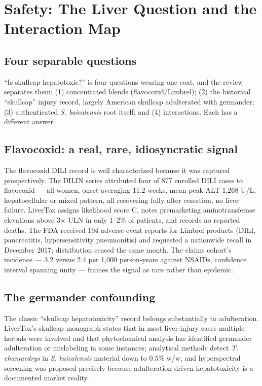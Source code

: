 \section{Safety: The Liver Question and the Interaction Map}
\label{sec:safety}

\subsection{Four separable questions}

``Is skullcap hepatotoxic?'' is four questions wearing one coat, and the review separates them: (1) concentrated blends (flavocoxid/Limbrel); (2) the historical ``skullcap'' injury record, largely American skullcap adulterated with germander; (3) authenticated \textit{S. baicalensis} root itself; and (4) interactions. Each has a different answer.

\subsection{Flavocoxid: a real, rare, idiosyncratic signal}

The flavocoxid DILI record is well characterized because it was captured prospectively. The DILIN series attributed four of 877 enrolled DILI cases to flavocoxid --- all women, onset averaging 11.2 weeks, mean peak ALT 1{,}268 U/L, hepatocellular or mixed pattern, all recovering fully after cessation, no liver failure. LiverTox assigns likelihood score C, notes premarketing aminotransferase elevations above 3$\times$ ULN in only 1--2\% of patients, and records no reported deaths. The FDA received 194 adverse-event reports for Limbrel products (DILI, pancreatitis, hypersensitivity pneumonitis) and requested a nationwide recall in December 2017; distribution ceased the same month. The claims cohort's incidence --- 3.2 versus 2.4 per 1{,}000 person-years against NSAIDs, confidence interval spanning unity --- frames the signal as rare rather than epidemic.

\subsection{The germander confounding}

The classic ``skullcap hepatotoxicity'' record belongs substantially to adulteration. LiverTox's skullcap monograph states that in most liver-injury cases multiple herbals were involved and that phytochemical analysis has identified germander adulteration or mislabeling in some instances; analytical methods detect \textit{T. chamaedrys} in \textit{S. baicalensis} material down to 0.5\% w/w, and hyperspectral screening was proposed precisely because adulteration-driven hepatotoxicity is a documented market reality.

